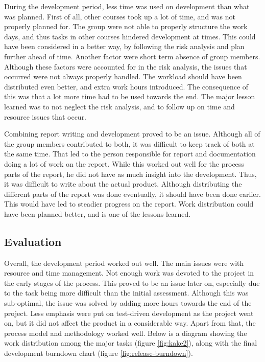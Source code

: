 During the development period, less time was used on development than what was planned. First of all, other courses took up a lot of time, and was not properly planned for. The group were not able to properly structure the work days, and thus tasks in other courses hindered development at times. This could have been considered in a better way, by following the risk analysis and plan further ahead of time. Another factor were short term absence of group members. Although these factors were accounted for in the risk analysis, the issues that occurred were not always properly handled. The workload should have been distributed even better, and extra work hours introduced. The consequence of this was that a lot more time had to be used towards the end. The major lesson learned was to not neglect the risk analysis, and to follow up on time and resource issues that occur. 

Combining report writing and development proved to be an issue. Although all of the group members contributed to both, it was difficult to keep track of both at the same time. That led to the person responsible for report and documentation doing a lot of work on the report. While this worked out well for the process parts of the report, he did not have as much insight into the development. Thus, it was difficult to write about the actual product. Although distributing the different parts of the report was done eventually, it should have been done earlier. This would have led to steadier progress on the report. Work distribution could have been planned better, and is one of the lessons learned.

\subsection{Evaluation}
\label{subsec:project_evaluation-development-evaluation}

Overall, the development period worked out well. The main issues were with resource and time management. Not enough work was devoted to the project in the early stages of the process. This proved to be an issue later on, especially due to the task being more difficult than the initial assessment. Although this was sub-optimal, the issue was solved by adding more hours towards the end of the project. Less emphasis were put on test-driven development as the project went on, but it did not affect the product in a considerable way. Apart from that, the process model and methodology worked well. Below is a diagram showing the work distribution among the major tasks (figure \ref{fig:kake2}), along with the final development burndown chart (figure \ref{fig:release-burndown}).

